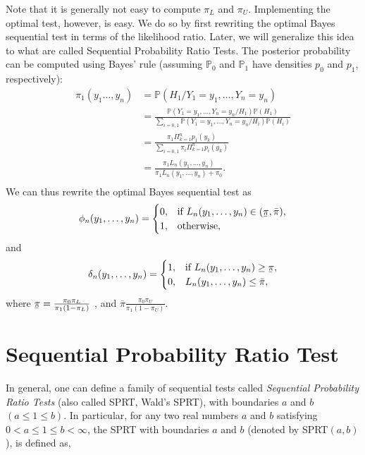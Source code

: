 \documentclass[a4paper,english,12pt]{article}
\newcommand{\spc}{\mathbb{P}}
\newcommand{\ubar}[1]{\underaccent{\bar}{#1}}
\begin{document}
 Note that it is generally not easy to compute $\pi_{L}$ and $\pi_{U}$. Implementing the optimal test, however, is easy. We do so by first rewriting the optimal Bayes sequential test in terms of the likelihood ratio. Later, we will generalize this idea to what are called Sequential Probability Ratio Tests. The posterior probability can be computed using Bayes' rule (assuming $\spc_{0}$ and $\spc_{1}$ have densities $p_{0}$ and $p_{1}$, respectively):\\
 \begin{align*}
 \pi_{1}(y_{1}\ldots,y_{n})&=\spc(H_{1}/Y_{1}=y_{1},\ldots,Y_{n}=y_{n})\\
 &=\frac{\spc(Y_{1}=y_{1},\ldots,Y_{n}=y_{n}/H_{1})\spc(H_{1})}{\sum_{i=0,1}\spc(Y_{1}=y_{1},\ldots,Y_{n}=y_{n}/H_{i})\spc(H_{i})}\\
 &=\frac{\pi_{1}\Pi_{k=1}^{n}p_{1}(y_{k})}{\sum_{i=0,1}\pi_{i}\Pi_{k=1}^{n}p_{i}(y_{k})}\\
 &=\frac{\pi_{1}L_{n}(y_{1},\ldots,y_{n})}{\pi_{1}L_{n}(y_{1},\ldots,y_{n})+\pi_{0}}.\\
 \end{align*}
 We can thus rewrite the optimal Bayes sequential test as
 \begin{equation*}
 \phi_{n}(y_{1},\ldots,y_{n})=
 \begin{cases}
 0,& \text{if }L_{n}(y_{1},\ldots,y_{n})\in(\ubar{\pi},\bar{\pi}),\\
 1,& \text{otherwise},
 \end{cases}
 \end{equation*}
 and
 \begin{equation*}
 \delta_{n}(y_{1},\ldots,y_{n})=
 \begin{cases}
 1,& \text{if }L_{n}(y_{1},\ldots,y_{n})\geq\ubar{\pi},\\
 0,& L_{n}(y_{1},\ldots,y_{n})\leq\bar{\pi},
 \end{cases}
 \end{equation*}
 where $\ubar{\pi}=\frac{\pi_{0}\pi_{L}}{\pi_{1}(1-\pi_{L})}$
 , and $\bar{\pi}\frac{\pi_{0}\pi_{U}}{\pi_{1}(1-\pi_{U})}$.
\section{Sequential Probability Ratio Test}
In general, one can define a family of sequential tests called \textit{Sequential Probability Ratio Tests} (also called SPRT, Wald's SPRT), with boundaries $a$ and $b$ $(a\leq1\leq b).$ In particular, for any two real numbers $a$ and $b$ satisfying $0 < a \leq 1 \leq b < \infty$, the SPRT with boundaries $a$ and $b$ (denoted by SPRT$( a,b )$), is defined as,
\end{document}

